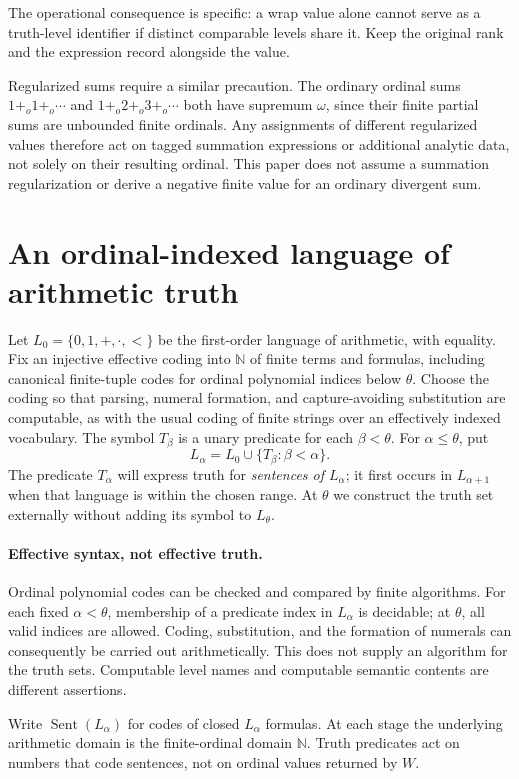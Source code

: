 \documentclass[11pt]{article}
\theoremstyle{definition}
\newcommand{\N}{\mathbb N}
\newcommand{\Sent}{\operatorname{Sent}}
\begin{document}
The operational consequence is specific: a wrap value alone cannot serve as a truth-level identifier if distinct comparable levels share it. Keep the original rank and the expression record alongside the value.

Regularized sums require a similar precaution. The ordinary ordinal sums $1+_o1+_o\cdots$ and $1+_o2+_o3+_o\cdots$ both have supremum $\omega$, since their finite partial sums are unbounded finite ordinals. Any assignments of different regularized values therefore act on tagged summation expressions or additional analytic data, not solely on their resulting ordinal. This paper does not assume a summation regularization or derive a negative finite value for an ordinary divergent sum.

\section{An ordinal-indexed language of arithmetic truth}
Let $L_0=\{0,1,+,\cdot,<\}$ be the first-order language of arithmetic, with equality. Fix an injective effective coding into $\N$ of finite terms and formulas, including canonical finite-tuple codes for ordinal polynomial indices below $\theta$. Choose the coding so that parsing, numeral formation, and capture-avoiding substitution are computable, as with the usual coding of finite strings over an effectively indexed vocabulary. The symbol $T_\beta$ is a unary predicate for each $\beta<\theta$. For $\alpha\le\theta$, put
\[
L_\alpha=L_0\cup\{T_\beta : \beta<\alpha\}.
\]
The predicate $T_\alpha$ will express truth for \emph{sentences of $L_\alpha$}; it first occurs in $L_{\alpha+1}$ when that language is within the chosen range. At $\theta$ we construct the truth set externally without adding its symbol to $L_\theta$.

\paragraph{Effective syntax, not effective truth.}
Ordinal polynomial codes can be checked and compared by finite algorithms. For each fixed $\alpha<\theta$, membership of a predicate index in $L_\alpha$ is decidable; at $\theta$, all valid indices are allowed. Coding, substitution, and the formation of numerals can consequently be carried out arithmetically. This does not supply an algorithm for the truth sets. Computable level names and computable semantic contents are different assertions.

Write $\Sent(L_\alpha)$ for codes of closed $L_\alpha$ formulas. At each stage the underlying arithmetic domain is the finite-ordinal domain $\N$. Truth predicates act on numbers that code sentences, not on ordinal values returned by $W$.
\end{document}
